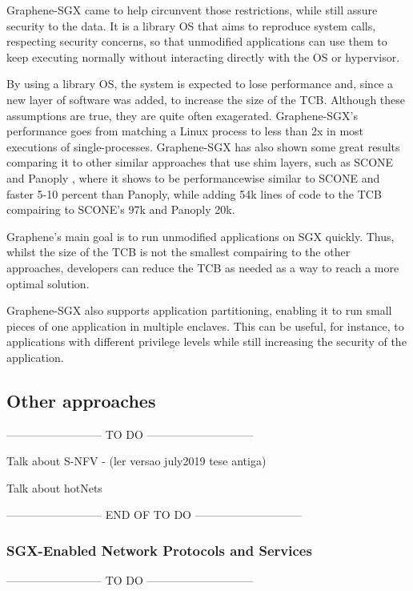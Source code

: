 Graphene-SGX \cite{graphenePaper} came to help circunvent those restrictions, while still assure security to the data. It is a library OS that aims to reproduce system calls, respecting security concerns, so that unmodified applications can use them to keep executing normally without interacting directly with the OS or hypervisor. 

By using a library OS, the system is expected to lose performance and, since a new layer of software was added, to increase the size of the TCB. 
Although these assumptions are true, they are quite often exagerated. Graphene-SGX's performance goes from matching a Linux process to less than 2x in most executions of single-processes.
Graphene-SGX has also shown some great results comparing it to other similar approaches that use shim layers, such as SCONE \cite{sconePaper} and Panoply \cite{panoplyPaper}, where it shows to be performancewise similar to SCONE and faster 5-10 percent than Panoply, while adding 54k lines of code to the TCB compairing to SCONE's 97k and Panoply 20k.

Graphene's main goal is to run unmodified applications on SGX quickly. Thus, whilst the size of the TCB is not the smallest compairing to the other approaches, developers can reduce the TCB as needed as a way to reach a more optimal solution. 

Graphene-SGX also supports application partitioning, enabling it to run small pieces of one application in multiple enclaves. This can be useful, for instance, to applications with different privilege levels while still increasing the security of the application.
\subsection{Other approaches}

-------------------------- TO DO -----------------------------

Talk about S-NFV - (ler versao july2019 tese antiga)

Talk about hotNets

-------------------------- END OF TO DO -----------------------------


\subsubsection{SGX-Enabled Network Protocols and Services}

-------------------------- TO DO -----------------------------

